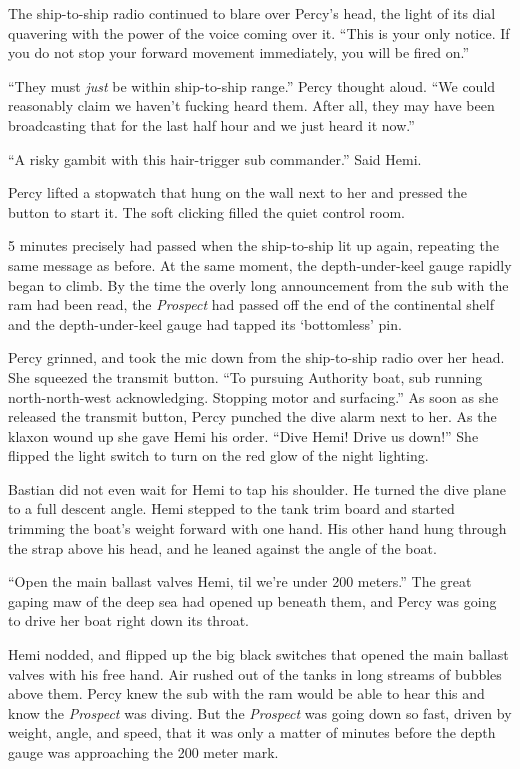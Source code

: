 \documentclass[
]{scrbook}
\begin{document}
The ship-to-ship radio continued to blare over Percy's head, the light
of its dial quavering with the power of the voice coming over it. ``This
is your only notice. If you do not stop your forward movement
immediately, you will be fired on.''

``They must \emph{just} be within ship-to-ship range.'' Percy thought
aloud. ``We could reasonably claim we haven't fucking heard them. After
all, they may have been broadcasting that for the last half hour and we
just heard it now.''

``A risky gambit with this hair-trigger sub commander.'' Said Hemi.

Percy lifted a stopwatch that hung on the wall next to her and pressed
the button to start it. The soft clicking filled the quiet control room.

5 minutes precisely had passed when the ship-to-ship lit up again,
repeating the same message as before. At the same moment, the
depth-under-keel gauge rapidly began to climb. By the time the overly
long announcement from the sub with the ram had been read, the
\emph{Prospect} had passed off the end of the continental shelf and the
depth-under-keel gauge had tapped its `bottomless' pin.

Percy grinned, and took the mic down from the ship-to-ship radio over
her head. She squeezed the transmit button. ``To pursuing Authority
boat, sub running north-north-west acknowledging. Stopping motor and
surfacing.'' As soon as she released the transmit button, Percy punched
the dive alarm next to her. As the klaxon wound up she gave Hemi his
order. ``Dive Hemi! Drive us down!'' She flipped the light switch to
turn on the red glow of the night lighting.

Bastian did not even wait for Hemi to tap his shoulder. He turned the
dive plane to a full descent angle. Hemi stepped to the tank trim board
and started trimming the boat's weight forward with one hand. His other
hand hung through the strap above his head, and he leaned against the
angle of the boat.

``Open the main ballast valves Hemi, til we're under 200 meters.'' The
great gaping maw of the deep sea had opened up beneath them, and Percy
was going to drive her boat right down its throat.

Hemi nodded, and flipped up the big black switches that opened the main
ballast valves with his free hand. Air rushed out of the tanks in long
streams of bubbles above them. Percy knew the sub with the ram would be
able to hear this and know the \emph{Prospect} was diving. But the
\emph{Prospect} was going down so fast, driven by weight, angle, and
speed, that it was only a matter of minutes before the depth gauge was
approaching the 200 meter mark.
\end{document}
